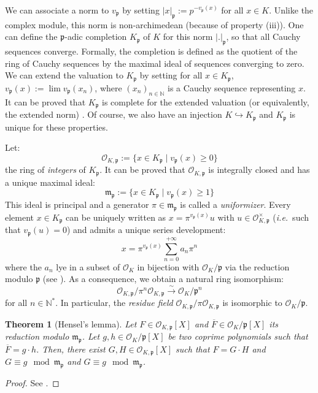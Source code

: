 \documentclass[a4paper,10pt]{report}
\theoremstyle{definition}
\theoremstyle{plain}
\newtheorem{theorem}[definition]{Theorem}
\theoremstyle{definition}
\newcommand{\ie}{\emph{i.e.}\ }
\newcommand{\N}{\mathbb{N}}
\newcommand{\mO}{\mathcal{O}}
\renewcommand{\(}{\left(}
\renewcommand{\)}{\right)}
\newcommand{\mf}[1]{\mathfrak{#1}}
\begin{document}
We can associate a norm to $v_{\mf{p}}$ by setting $|x|_{\mf{p}}:=p^{-v_{\mf{p}}(x)}$ for all $x\in K$. Unlike the complex module, this norm is non-archimedean (because of property (iii)). One can define the $\mf{p}$-adic completion $K_{\mf{p}}$ of $K$ for this norm $|.|_{\mf{p}}$, so that all Cauchy sequences converge.  Formally, the completion is defined as the quotient of the ring of Cauchy sequences by the maximal ideal of sequences converging to zero. We can extend the valuation to $K_{\mf{p}}$ by setting for all $x\in K_{\mf{p}}$, $v_{\mf{p}}(x):=\lim v_{\mf{p}}(x_n)$, where $(x_n)_{n\in\N}$ is a Cauchy sequence representing $x$.  It can be proved that $K_{\mf{p}}$ is complete for the extended valuation (or equivalently, the extended norm) \cite[theorem II.2.1]{Janusz}. Of course, we also have an injection $K\hookrightarrow K_{\mf{p}}$ and $K_{\mf{p}}$ is unique for these properties. 

Let:
\[\mO_{K,\mf{p}}:=\{x\in K_{\mf{p}}\mid v_{\mf{p}}(x)\geq 0\}\]
the ring of \emph{integers} of $K_{\mf{p}}$. It can be proved that $\mO_{K,\mf{p}}$ is integrally closed and has a unique maximal ideal:
\[\mf{m}_{\mf{p}}:=\{x\in K_{\mf{p}}\mid v_{\mf{p}}(x)\geq 1\}\]
This ideal is principal and a generator $\pi\in\mf{m}_{\mf{p}}$ is called a \emph{uniformizer}. Every element $x\in K_{\mf{p}}$ can be uniquely written as $x=\pi^{v_{\mf{p}}(x)}u$ with $u\in \mO_{K,\mf{p}}^\times$ (\ie such that $v_{\mf{p}}(u)=0$) and admits a unique series development:
\[x=\pi^{v_{\mf{p}}(x)}\sum_{n=0}^{+\infty} a_n\pi^n\]
where the $a_n$ lye in a subset of $\mO_K$ in bijection with $\mO_K/\mf{p}$ via the reduction modulo $\mf{p}$ (see \cite[proposition II.2.8]{Janusz}). As a consequence, we obtain a natural ring isomorphism:
\[\mO_{K,\mf{p}}/\pi^n\mO_{K,\mf{p}}\overset{\sim}{\longrightarrow}\mO_K/\mf{p}^n\]
for all $n\in\N^*$. In particular, the \emph{residue field} $\mO_{K,\mf{p}}/\pi\mO_{K,\mf{p}}$ is isomorphic to $\mO_K/\mf{p}$.

\begin{theorem}[Hensel's lemma]\label{theorem 9}
Let $F\in \mO_{K,\mf{p}}[X]$ and $\overline{F}\in\mO_K/\mf{p}[X]$ its reduction modulo $\mf{m}_{\mf{p}}$. Let $g,h\in \mO_K/\mf{p}[X]$ be two coprime polynomials such that $\overline{F}=g\cdot h$. Then, there exist $G,H\in \mO_{K,\mf{p}}[X]$ such that $F=G\cdot H$ and $G\equiv g \mod \mf{m}_{\mf{p}}$ and $G\equiv g \mod \mf{m}_{\mf{p}}$.
\end{theorem}

\begin{proof}
See \cite[lemma II.3.5]{Janusz}.
\end{proof}
\end{document}
